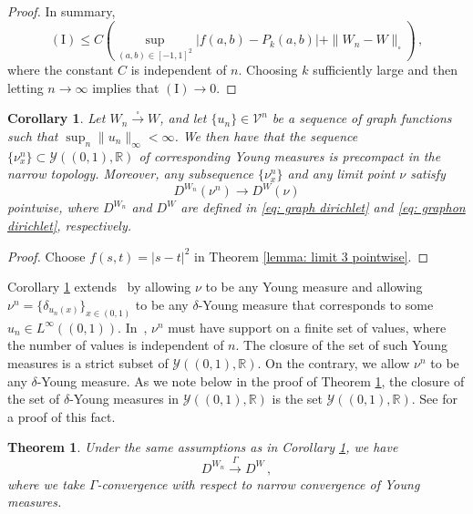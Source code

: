 \documentclass[11pt]{amsart}
\newtheorem{corollary}{Corollary}
\newtheorem{theorem}{Theorem}[section]
\def\R{\mathbb{R}}
\def\calY{\mathcal{Y}}
\def\ra{\rightarrow}
\def\gamra{\stackrel{\Gamma}{\longrightarrow}}
\def\sqra{\stackrel{\square}{\longrightarrow}}
\numberwithin{equation}{section}
\begin{document}
{{\begin{proof}
In summary,
\begin{equation*}
    {(\mathrm{I})} \leq C \left(  \sup_{(a,b) \in [-1,1]^2 } |f(a,b) - P_k(a,b)| + \|W_n - W\|_\square \right) \,,
\end{equation*}
where the constant $C$ is independent of $n$. Choosing $k$ sufficiently large and then letting $n \to \infty$ implies that {$(\mathrm{I}) \to 0$}. 
\end{proof}


\begin{corollary}\label{cor: dirichlet convergence} 
Let $W_n \sqra W$, and let {$\{u_n\} \in \mathcal{V}^n$} be a sequence of graph functions such that $\sup_n \|u_n\|_\infty < \infty$. We then have that the {sequence $\{\nu^n_x\} \subset \mathcal{Y}((0,1),\R)$ of corresponding Young measures} is precompact in the narrow topology. Moreover, any subsequence $\{\nu^n_x\}$ and any limit point $\nu$ {satisfy}
 \begin{equation} \label{cor2}
    	D^{W_n}(\nu^n) \ra D^W(\nu) 
\end{equation}	
pointwise, where $D^{W_n}$ and $D^W$ are defined {in \eqref{eq: graph dirichlet} and \eqref{eq: graphon dirichlet}, respectively.}
\end{corollary}

\begin{proof}
    Choose $f(s,t) = |s - t|^2$ in Theorem \ref{lemma: limit 3 pointwise}. 
\end{proof}


Corollary \ref{cor: dirichlet convergence} extends~\cite[Lemma 11]{braides2020cut} by allowing $\nu$ to be any Young measure and allowing {$\nu^n = \{\delta_{u_n(x)}\}_{x\in (0,1)}$ to be any $\delta$-Young measure {that corresponds} to some} $u_n \in L^\infty((0,1))$. In~\cite[Lemma 11]{braides2020cut}, $\nu^n$ must have support on a finite set of values, where the number of values is independent of $n$. The closure of the set of such Young measures is a strict subset of $\calY((0,1),\R)$. On the contrary, we allow $\nu^n$ to be any $\delta$-Young measure. As we note {below} in the proof of Theorem \ref{thm: dirichlet gamma convergence}, the closure of the set of $\delta$-Young measures in $\calY((0,1),\R)$ is the set $\calY((0,1),\R)$. See \cite[Proposition 8]{valadier1990young} for a proof of this fact.

\begin{theorem}\label{thm: dirichlet gamma convergence} 
Under the same assumptions as in Corollary \ref{cor: dirichlet convergence}, we have
\begin{equation}
	D^{W_n} \gamra {D^W} \,,
\end{equation}	 
where we take $\Gamma$-convergence with respect to narrow convergence of Young measures. 
\end{theorem}


}}
\end{document}
